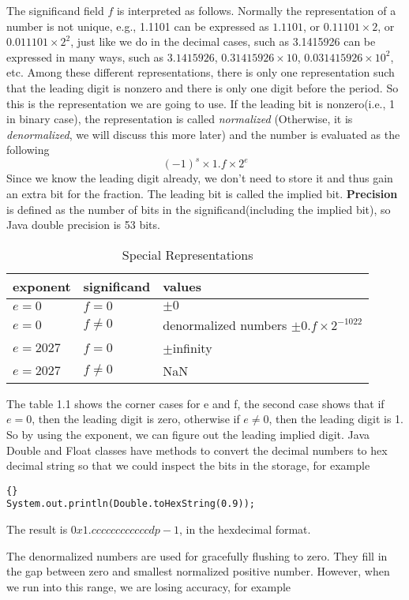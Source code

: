 The significand field $f$ is interpreted as follows. Normally the representation of a number is not unique, e.g., 1.1101 can be expressed as $1.1101$, or $0.11101 \times 2$, or $0.011101 \times 2^2$, just like we do in the decimal cases, such as 3.1415926 can be expressed in many ways, such as $3.1415926$, $0.31415926 \times 10$, $0.031415926 \times 10^2$, etc. Among these different representations, there is only one representation such that the leading digit is nonzero and there is only one digit before the period. So this is the representation we are going to use. If the leading bit is nonzero(i.e., 1 in binary case), the representation is called \textit{normalized} (Otherwise, it is \textit{denormalized}, we will discuss this more later) and the number is evaluated as the following
\[ (-1)^s \times 1.f \times 2^e\]
Since we know the leading digit already, we don't need to store it and thus gain an extra bit for the fraction. The leading bit is called the implied bit. \textbf{Precision} is defined as the number of bits in the significand(including the implied bit), so Java double precision is 53 bits.
\begin{table}
\caption{Special Representations}
\centering
\begin{tabular}{l l l} 
\hline\hline
exponent & significand & values \\
\hline
$e = 0$ & $f = 0$ & $\pm 0$ \\
$e = 0$ & $f \neq 0$ & denormalized numbers $\pm 0.f \times 2^{-1022}$ \\
$e = 2027$ & $f = 0$ & $\pm$infinity \\
$e = 2027$ & $f \neq 0$ & NaN \\
\end{tabular}
\end{table}

The table 1.1 shows the corner cases for e and f, the second case shows that if $e = 0$, then the leading digit is zero, otherwise if $e \neq 0$, then the leading digit is 1. So by using the exponent, we can figure out the leading implied digit. Java Double and Float classes have methods to convert the decimal numbers to hex decimal string so that we could inspect the bits in the storage, for example  
\begin{lstlisting}[frame=trbl]{}
System.out.println(Double.toHexString(0.9));
\end{lstlisting}
The result is $0x1.ccccccccccccdp-1$, in the hexdecimal format. 

The denormalized numbers are used for gracefully flushing to zero. They fill in the gap between zero and smallest normalized positive number. However, when we run into this range, we are losing accuracy, for example

